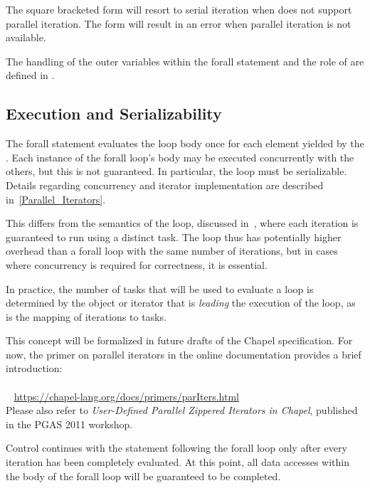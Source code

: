 The square bracketed form will resort to serial iteration
when  does not support parallel iteration.
The  form will result in an error when parallel iteration
is not available.

The handling of the outer variables within the forall statement and
the role of  are defined in .

\subsection{Execution and Serializability}
\label{forall_semantics}

The forall statement evaluates the loop body once for each element
yielded by the .  Each instance of the
forall loop's body may be executed concurrently with the others, but
this is not guaranteed.  In particular, the loop must be serializable.
Details regarding concurrency and iterator implementation are
described in~\ref{Parallel_Iterators}.

This differs from the semantics of the  loop, discussed
in~, where each iteration is guaranteed to run using a
distinct task.  The  loop thus has potentially higher
overhead than a forall loop with the same number of iterations, but in
cases where concurrency is required for correctness, it is essential.

In practice, the number of tasks that will be used to evaluate
a  loop is determined by the object or iterator that
is \emph{leading} the execution of the loop, as is the mapping of
iterations to tasks.

This concept will be formalized in future drafts of the Chapel
specification. For now, the primer on parallel iterators
in the online documentation provides a brief introduction:
\\ %
\mbox{$$ $$ $$ $$ $$} %
\url{https://chapel-lang.org/docs/primers/parIters.html}
\\
Please also refer to \emph{User-Defined Parallel Zippered Iterators in
Chapel}, published in the PGAS 2011 workshop.

Control continues with the statement following the forall loop only
after every iteration has been completely evaluated.  At this point,
all data accesses within the body of the forall loop will be
guaranteed to be completed.

